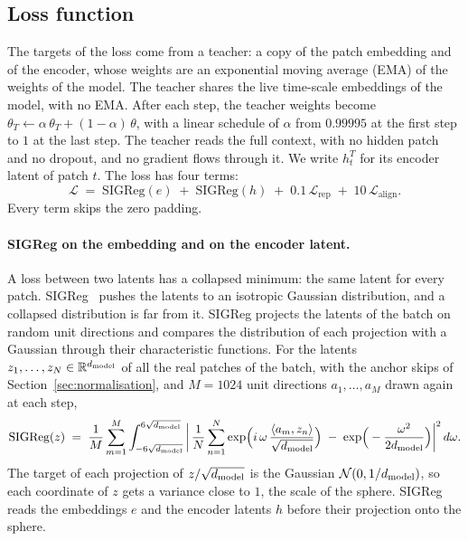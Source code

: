 \subsection{Loss function}
\label{sec:loss}

The targets of the loss come from a teacher: a copy of the patch
embedding and of the encoder, whose weights are an exponential moving
average (EMA) of the weights of the model. The teacher shares the live
time-scale embeddings of the model, with no EMA. After each step, the
teacher weights become $\theta_T \leftarrow \alpha\,\theta_T +
(1 - \alpha)\,\theta$, with a linear schedule of $\alpha$ from
$0.99995$ at the first step to $1$ at the last step. The teacher reads the full context, with no hidden
patch and no dropout, and no gradient flows through it. We write $h^T_t$ for its
encoder latent of patch $t$. The loss has four terms:
\begin{equation}
  \mathcal{L} \;=\;
  \mathrm{SIGReg}(e) \;+\; \mathrm{SIGReg}(h)
  \;+\; 0.1\, \mathcal{L}_{\mathrm{rep}}
  \;+\; 10\, \mathcal{L}_{\mathrm{align}}.
  \label{eq:loss-total}
\end{equation}
Every term skips the zero padding.

\paragraph{SIGReg on the embedding and on the encoder latent.}
A loss between two latents has a collapsed minimum: the same latent for
every patch. SIGReg~\citep{balestriero2025lejepa} pushes the latents to
an isotropic Gaussian distribution, and a collapsed distribution is far
from it. SIGReg projects the latents of the batch on random unit
directions and compares the distribution of each projection with a
Gaussian through their characteristic functions. For the latents
$z_1, \ldots, z_N \in \mathbb{R}^{d_{\mathrm{model}}}$ of all the real patches of the
batch, with the anchor skips of Section~\ref{sec:normalisation}, and $M = 1024$ unit directions $a_1, \ldots, a_M$ drawn again
at each step,
\begin{equation*}
  \mathrm{SIGReg}(z) \;=\; \frac{1}{M} \sum_{m=1}^{M}
  \int_{-6\sqrt{d_{\mathrm{model}}}}^{6\sqrt{d_{\mathrm{model}}}}
  \bigg|\, \frac{1}{N} \sum_{n=1}^{N}
  \exp\!\Big(i\,\omega\, \frac{\langle a_m, z_n \rangle}{\sqrt{d_{\mathrm{model}}}}\Big)
  \;-\; \exp\!\Big(-\frac{\omega^2}{2d_{\mathrm{model}}}\Big) \bigg|^2 \, d\omega .
\end{equation*}
The target of each projection of $z / \sqrt{d_{\mathrm{model}}}$ is the Gaussian
$\mathcal{N}(0, 1/d_{\mathrm{model}})$, so each coordinate of $z$ gets a variance close
to $1$, the scale of the sphere. SIGReg reads the embeddings $e$ and
the encoder latents $h$ before their projection onto the sphere.

